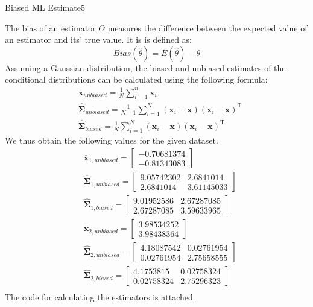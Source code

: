 \begin{questions}
\begin{question}{Biased ML Estimate}{5}
\begin{answer}
The bias of an estimator $\Theta$ measures the difference between the expected value of an estimator and its' true value. It is is defined as:
\begin{equation*}
Bias(\widehat{\theta})= E(\widehat{\theta}) - \theta
\end{equation*}
Assuming a Gaussian distribution, the biased and unbiased estimates of the conditional distributions can be calculated using the following formula:
\begin{align*}
&\overline{\mathbf{x}}_{unbiased}= \frac{1}{N} \sum_{i=1}^{n} \mathbf{x}_{i} \\
&\widehat{\boldsymbol{\Sigma}}_{unbiased}=\frac{1}{N-1} \sum_{i=1}^{N}(\mathbf{x}_{i}-\overline{\mathbf{x}})(\mathbf{x}_{i}-\overline{\mathbf{x}})^{\mathrm{T}} \\
&\widehat{\boldsymbol{\Sigma}}_{biased}=\frac{1}{N} \sum_{i=1}^{N}(\mathbf{x}_{i}-\overline{\mathbf{x}})(\mathbf{x}_{i}-\overline{\mathbf{x}})^{\mathrm{T}}
\end{align*}
We thus obtain the following values for the given dataset.
\begin{align*}
&\overline{\mathbf{x}}_{1, unbiased} =  
\begin{bmatrix} 
-0.70681374 \\
 -0.81343083
\end{bmatrix}\\
&\widehat{\boldsymbol{\Sigma}}_{1, unbiased} =
\begin{bmatrix} 
9.05742302 & 2.6841014 \\
2.6841014 & 3.61145033 
\end{bmatrix}
\\
&\widehat{\boldsymbol{\Sigma}}_{1, biased} =
\begin{bmatrix} 
9.01952586 & 2.67287085 \\
2.67287085 & 3.59633965 
\end{bmatrix}
\\
&\overline{\mathbf{x}}_{2, unbiased} =
\begin{bmatrix} 
3.98534252 \\
3.98438364
\end{bmatrix}\\
&\widehat{\boldsymbol{\Sigma}}_{2, unbiased} =
\begin{bmatrix} 
4.18087542  & 0.02761954 \\
0.02761954 & 2.75658555 
\end{bmatrix}
\\
&\widehat{\boldsymbol{\Sigma}}_{2, biased} =
\begin{bmatrix} 
4.1753815 & 0.02758324 \\
0.02758324 & 2.75296323
\end{bmatrix}
\\
\end{align*}
The code for calculating the estimators is attached.

\end{answer}
\end{question}



\end{questions}
